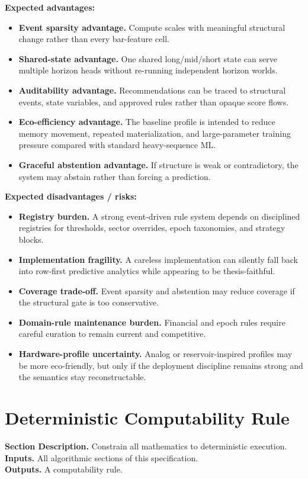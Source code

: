 \documentclass[11pt]{report}
\newcommand{\meta}[3]{\textbf{Section Description.} #1\\
\textbf{Inputs.} #2\\
\textbf{Outputs.} #3\par}
\begin{document}
\textbf{Expected advantages:}
\begin{itemize}
    \item \textbf{Event sparsity advantage.} Compute scales with meaningful structural change rather than every bar-feature cell.
    \item \textbf{Shared-state advantage.} One shared long/mid/short state can serve multiple horizon heads without re-running independent horizon worlds.
    \item \textbf{Auditability advantage.} Recommendations can be traced to structural events, state variables, and approved rules rather than opaque score flows.
    \item \textbf{Eco-efficiency advantage.} The baseline profile is intended to reduce memory movement, repeated materialization, and large-parameter training pressure compared with standard heavy-sequence ML.
    \item \textbf{Graceful abstention advantage.} If structure is weak or contradictory, the system may abstain rather than forcing a prediction.
\end{itemize}

\textbf{Expected disadvantages / risks:}
\begin{itemize}
    \item \textbf{Registry burden.} A strong event-driven rule system depends on disciplined registries for thresholds, sector overrides, epoch taxonomies, and strategy blocks.
    \item \textbf{Implementation fragility.} A careless implementation can silently fall back into row-first predictive analytics while appearing to be thesis-faithful.
    \item \textbf{Coverage trade-off.} Event sparsity and abstention may reduce coverage if the structural gate is too conservative.
    \item \textbf{Domain-rule maintenance burden.} Financial and epoch rules require careful curation to remain current and competitive.
    \item \textbf{Hardware-profile uncertainty.} Analog or reservoir-inspired profiles may be more eco-friendly, but only if the deployment discipline remains strong and the semantics stay reconstructable.
\end{itemize}

\section{Deterministic Computability Rule}
\meta{Constrain all mathematics to deterministic execution.}{All algorithmic sections of this specification.}{A computability rule.}
\end{document}

